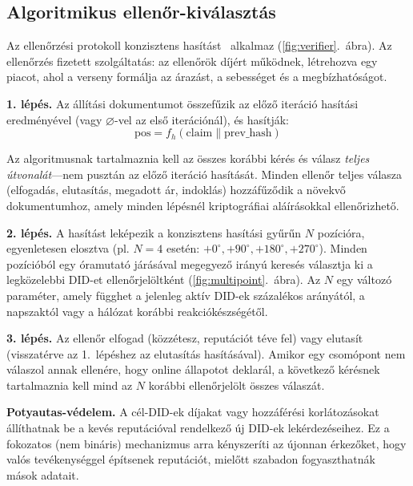 \documentclass[11pt,a4paper,twocolumn]{article}
\begin{document}
\subsection{Algoritmikus ellenőr-kiválasztás}

Az ellenőrzési protokoll konzisztens hasítást~\cite{karger1997} alkalmaz (\ref{fig:verifier}.~ábra). Az ellenőrzés fizetett szolgáltatás: az ellenőrök díjért működnek, létrehozva egy piacot, ahol a verseny formálja az árazást, a sebességet és a megbízhatóságot.

\textbf{1. lépés.} Az állítási dokumentumot összefűzik az előző iteráció hasítási eredményével (vagy $\varnothing$-vel az első iterációnál), és hasítják:
\begin{equation}
\text{pos} = f_h(\text{claim} \| \text{prev\_hash})
\label{eq:hash}
\end{equation}

Az algoritmusnak tartalmaznia kell az összes korábbi kérés és válasz \emph{teljes útvonalát}---nem pusztán az előző iteráció hasítását. Minden ellenőr teljes válasza (elfogadás, elutasítás, megadott ár, indoklás) hozzáfűződik a növekvő dokumentumhoz, amely minden lépésnél kriptográfiai aláírásokkal ellenőrizhető.

\textbf{2. lépés.} A hasítást leképezik a konzisztens hasítási gyűrűn $N$ pozícióra, egyenletesen elosztva (pl. $N=4$ esetén: $+0^{\circ}, +90^{\circ}, +180^{\circ}, +270^{\circ}$). Minden pozícióból egy óramutató járásával megegyező irányú keresés választja ki a legközelebbi DID-et ellenőrjelöltként (\ref{fig:multipoint}.~ábra). Az $N$ egy változó paraméter, amely függhet a jelenleg aktív DID-ek százalékos arányától, a napszaktól vagy a hálózat korábbi reakciókészségétől.

\textbf{3. lépés.} Az ellenőr elfogad (közzétesz, reputációt téve fel) vagy elutasít (visszatérve az 1.~lépéshez az elutasítás hasításával). Amikor egy csomópont nem válaszol annak ellenére, hogy online állapotot deklarál, a következő kérésnek tartalmaznia kell mind az $N$ korábbi ellenőrjelölt összes válaszát.

\textbf{Potyautas-védelem.} A cél-DID-ek díjakat vagy hozzáférési korlátozásokat állíthatnak be a kevés reputációval rendelkező új DID-ek lekérdezéseihez. Ez a fokozatos (nem bináris) mechanizmus arra kényszeríti az újonnan érkezőket, hogy valós tevékenységgel építsenek reputációt, mielőtt szabadon fogyaszthatnák mások adatait.
\end{document}
